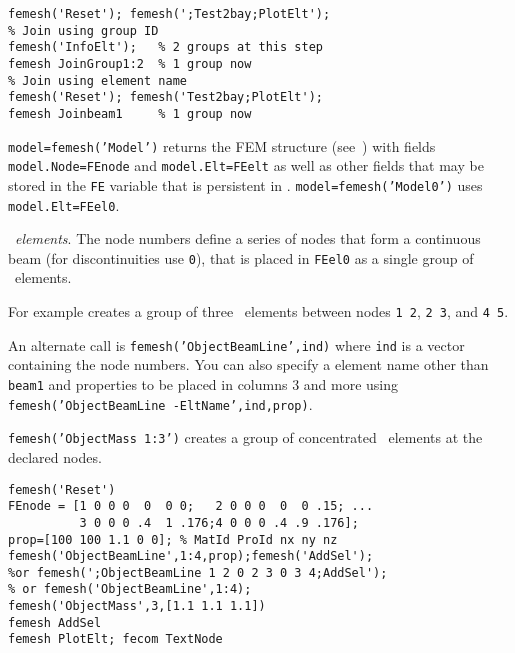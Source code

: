 \begin{verbatim}
femesh('Reset'); femesh(';Test2bay;PlotElt');
% Join using group ID
femesh('InfoElt');   % 2 groups at this step
femesh JoinGroup1:2  % 1 group now
% Join using element name
femesh('Reset'); femesh('Test2bay;PlotElt');
femesh Joinbeam1     % 1 group now
\end{verbatim}%


{\tt model=femesh('Model')} returns the FEM structure (see~) with fields {\tt model.Node=FEnode} and {\tt model.Elt=FEelt} as well as other fields that may be stored in the {\tt FE} variable that is persistent in \femesh. {\tt model=femesh('Model0')} uses {\tt model.Elt=FEel0}.


\beam\ {\sl elements}.  The node numbers  define a series of nodes that form a continuous beam (for discontinuities use {\tt 0}), that is placed in {\tt FEel0} as a single group of \beam\ elements.

For example  creates a group of three \beam\ elements between nodes {\tt 1 2}, {\tt 2 3}, and {\tt 4 5}.

An alternate call is {\tt femesh('ObjectBeamLine',ind)} where {\tt ind} is a vector containing the node numbers. You can also specify a element name other than {\tt beam1} and properties to be placed in columns 3 and more using {\tt femesh('ObjectBeamLine -EltName',ind,prop)}.

{\tt femesh('ObjectMass 1:3')} creates a group of concentrated \mass\ elements at the declared nodes.

\begin{verbatim}
femesh('Reset')
FEnode = [1 0 0 0  0  0 0;   2 0 0 0  0  0 .15; ... 
          3 0 0 0 .4  1 .176;4 0 0 0 .4 .9 .176];
prop=[100 100 1.1 0 0]; % MatId ProId nx ny nz
femesh('ObjectBeamLine',1:4,prop);femesh('AddSel');
%or femesh(';ObjectBeamLine 1 2 0 2 3 0 3 4;AddSel');
% or femesh('ObjectBeamLine',1:4);
femesh('ObjectMass',3,[1.1 1.1 1.1])
femesh AddSel
femesh PlotElt; fecom TextNode
\end{verbatim}%


